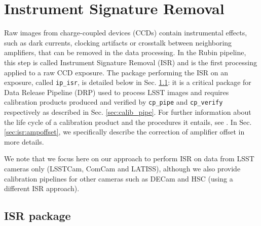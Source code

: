 \section{Instrument Signature Removal}
\label{sec:isr}

Raw images from charge-coupled devices (CCDs) contain instrumental effects, such as dark currents, clocking artifacts or crosstalk between neighboring amplifiers, that can be removed in the data processing.
In the Rubin pipeline, this step is called Instrument Signature Removal (ISR) and is the first processing applied to a raw CCD exposure.
The package performing the ISR on an exposure, called \texttt{ip\_isr}, is detailed below in Sec. \ref{sec:ip_isr}: it is a critical package for Data Release Pipeline (DRP) used to process LSST images and requires calibration products produced and verified by \texttt{cp\_pipe} and \texttt{cp\_verify} respectively as described in Sec. \ref{sec:calib_pipe}. For further information about the life cycle of a calibration product and the procedures it entails, see \citet{DMTN-222}. In Sec. \ref{sec:isr:ampoffset}, we specifically describe the correction of amplifier offset in more details.

We note that we focus here on our approach to perform ISR on data from LSST cameras only (LSSTCam, ComCam and LATISS), although we also provide calibration pipelines for other cameras such as DECam and HSC (using a different ISR approach).

\subsection{ISR package}
\label{sec:ip_isr}

